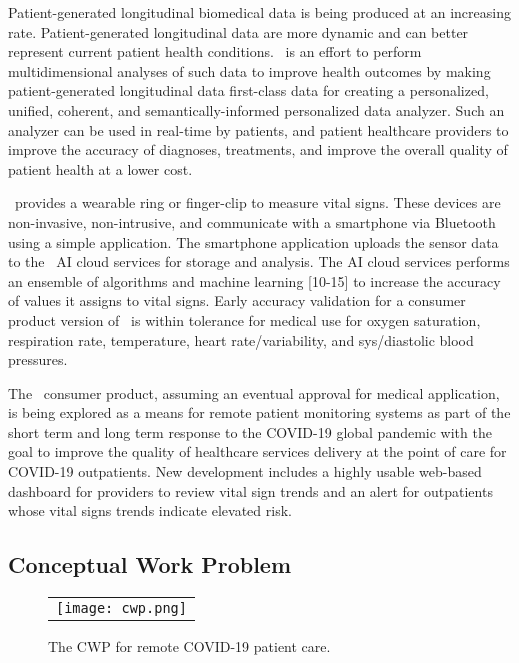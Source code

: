 Patient-generated longitudinal biomedical data is being produced at an increasing rate. Patient-generated longitudinal data are more dynamic and can better represent current patient health conditions. \phware\ is an effort to perform multidimensional analyses of such data to improve health outcomes by making patient-generated longitudinal data first-class data for creating a personalized, unified, coherent, and semantically-informed personalized data analyzer. Such an analyzer can be used in real-time by patients, and patient healthcare providers to improve the accuracy of diagnoses, treatments, and improve the overall quality of patient health at a lower cost.

\phware\ provides a wearable ring or finger-clip to measure vital signs. These devices are non-invasive, non-intrusive, and  communicate with a smartphone via Bluetooth using a simple application. The smartphone application uploads the sensor data to the \phware\ AI cloud services for storage and analysis. The AI cloud services performs an ensemble of algorithms and machine learning [10-15] to increase the accuracy of values it assigns to vital signs. Early accuracy validation for a consumer product version of \phware\ is within tolerance for medical use for oxygen saturation, respiration rate, temperature, heart rate/variability, and sys/diastolic blood pressures.

The \phware\ consumer product, assuming an eventual approval for medical application, is being explored as a means for remote patient monitoring systems as part of the short term and long term response to the COVID-19 global pandemic with the goal to improve the quality of healthcare services delivery at the point of care for COVID-19 outpatients. New development includes a highly usable web-based dashboard for providers to review vital sign trends and an alert for outpatients whose vital signs trends indicate elevated risk. 

\subsection{Conceptual Work Problem}
\begin{figure*}
  \begin{center}
    \begin{tabular}{c}
      \texttt{[image: cwp.png]}
    \end{tabular}
  \end{center}
\caption{The CWP for remote COVID-19 patient care.}
\label{fig:cwp}
\end{figure*}

